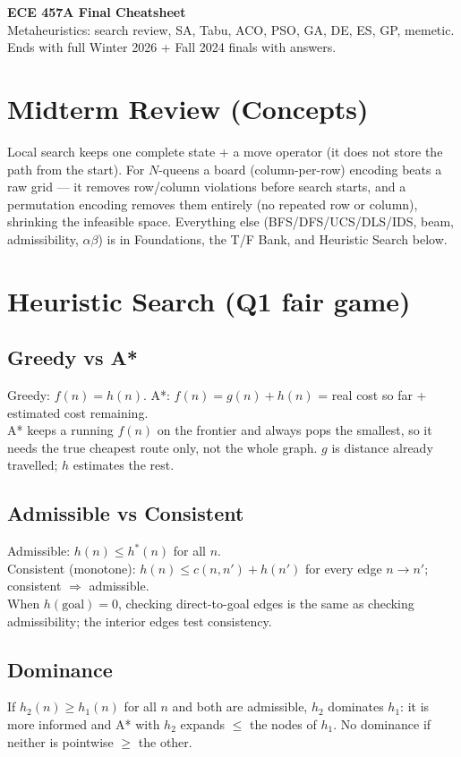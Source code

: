 \begin{tcolorbox}[cheatbox]
\textbf{ECE 457A Final Cheatsheet}\\
Metaheuristics: search review, SA, Tabu, ACO, PSO, GA, DE, ES, GP, memetic. Ends with full Winter 2026 + Fall 2024 finals with answers.
\end{tcolorbox}

\section{Midterm Review (Concepts)}
Local search keeps one complete state + a move operator (it does not store the path from the start). For \(N\)-queens a board (column-per-row) encoding beats a raw grid --- it removes row/column violations before search starts, and a permutation encoding removes them entirely (no repeated row or column), shrinking the infeasible space. Everything else (BFS/DFS/UCS/DLS/IDS, beam, admissibility, \(\alpha\beta\)) is in Foundations, the T/F Bank, and Heuristic Search below.

\section{Heuristic Search (Q1 fair game)}
\subsection*{Greedy vs A*}
Greedy: \(f(n)=h(n)\). A*: \(f(n)=g(n)+h(n)\) = real cost so far + estimated cost remaining.\\
A* keeps a running \(f(n)\) on the frontier and always pops the smallest, so it needs the true cheapest route only, not the whole graph. \(g\) is distance already travelled; \(h\) estimates the rest.

\subsection*{Admissible vs Consistent}
Admissible: \(h(n)\le h^*(n)\) for all \(n\).\\
Consistent (monotone): \(h(n)\le c(n,n')+h(n')\) for every edge \(n\!\to\!n'\); consistent \(\Rightarrow\) admissible.\\
When \(h(\text{goal})=0\), checking direct-to-goal edges is the same as checking admissibility; the interior edges test consistency.

\subsection*{Dominance}
If \(h_2(n)\ge h_1(n)\) for all \(n\) and both are admissible, \(h_2\) dominates \(h_1\): it is more informed and A* with \(h_2\) expands \(\le\) the nodes of \(h_1\). No dominance if neither is pointwise \(\ge\) the other.

